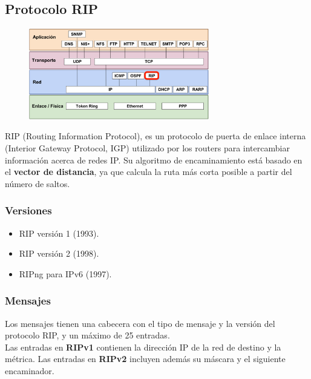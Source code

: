 \begin{onepage}
    \subsection{Protocolo RIP}
    \begin{figure}[H]
    \centering \includegraphics[width=0.7\textwidth]{img/RIP.png}
    \end{figure}
    
    RIP (Routing Information Protocol), es un protocolo de puerta de enlace interna (Interior Gateway Protocol, IGP) utilizado por los routers para intercambiar información acerca de redes IP. Su algoritmo de encaminamiento está basado en el \textbf{vector de distancia}, ya que calcula la ruta más corta posible a partir del número de saltos.\\
    
    \subsubsection{Versiones}
    \begin{itemize}
        \item RIP versión 1 (1993).
        \item RIP versión 2 (1998).
        \item RIPng para IPv6 (1997).
    \end{itemize}
    \subsubsection{Mensajes}
    Los mensajes tienen una cabecera con el tipo de mensaje y la versión del protocolo RIP, y un máximo de 25 entradas.\\
    
    Las entradas en \textbf{RIPv1} contienen la dirección IP de la red de destino y la métrica. Las entradas en \textbf{RIPv2} incluyen además su máscara y el siguiente encaminador.\\
    

\end{onepage}
